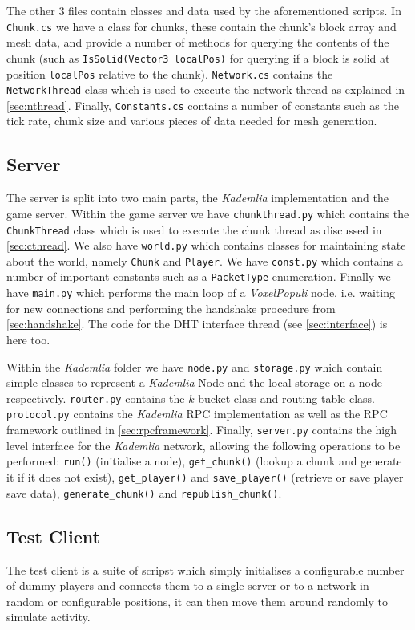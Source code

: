 \documentclass[10pt,twoside,notitlepage,a4paper]{report}
\newcommand{\kademlia}{\emph{Kademlia}}
\newcommand{\K}{$k$}
\newcommand{\voxpop}{\emph{VoxelPopuli}}
\begin{document}
	The other $3$ files contain classes and data used by the aforementioned scripts. In {\tt Chunk.cs} we have a class for chunks, these contain the chunk's block array and mesh data, and provide a number of methods for querying the contents of the chunk (such as {\tt IsSolid(Vector3 localPos)} for querying if a block is solid at position {\tt localPos} relative to the chunk). {\tt Network.cs} contains the {\tt NetworkThread} class which is used to execute the network thread as explained in \cref{sec:nthread}. Finally, {\tt Constants.cs} contains a number of constants such as the tick rate, chunk size and various pieces of data needed for mesh generation.
	
	\subsection{Server}
	The server is split into two main parts, the \kademlia{} implementation and the game server. Within the game server we have {\tt chunkthread.py} which contains the {\tt ChunkThread} class which is used to execute the chunk thread as discussed in \cref{sec:cthread}. We also have {\tt world.py} which contains classes for maintaining state about the world, namely {\tt Chunk} and {\tt Player}. We have {\tt const.py} which contains a number of important constants such as a {\tt PacketType} enumeration. Finally we have {\tt main.py} which performs the main loop of a \voxpop{} node, i.e. waiting for new connections and performing the handshake procedure from \cref{sec:handshake}. The code for the DHT interface thread (see \cref{sec:interface}) is here too.
	
	Within the \kademlia{} folder we have {\tt node.py} and {\tt storage.py} which contain simple classes to represent a \kademlia{} Node and the local storage on a node respectively. {\tt router.py} contains the \K-bucket class and routing table class. {\tt protocol.py} contains the \kademlia{} RPC implementation as well as the RPC framework outlined in \cref{sec:rpcframework}. Finally, {\tt server.py} contains the high level interface for the \kademlia{} network, allowing the following operations to be performed: {\tt run()} (initialise a node), {\tt get\_chunk()} (lookup a chunk and generate it if it does not exist), {\tt get\_player()} and {\tt save\_player()} (retrieve or save player save data), {\tt generate\_chunk()} and {\tt republish\_chunk()}.
	
	\subsection{Test Client}
	The test client is a suite of scripst which simply initialises a configurable number of dummy players and connects them to a single server or to a network in random or configurable positions, it can then move them around randomly to simulate activity.
	
\end{document}
